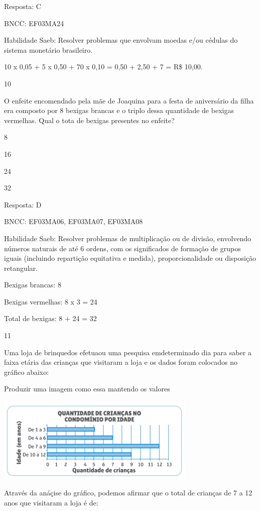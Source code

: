 \begin{escolha}
{\begin{escolha}
{Resposta: C

BNCC: EF03MA24

Habilidade Saeb: Resolver problemas que envolvam moedas e/ou cédulas do
sistema monetário brasileiro.

10 x 0,05 + 5 x 0,50 + 70 x 0,10 = 0,50 + 2,50 + 7 = R\$ 10,00.

\num{10}

O enfeite encomendado pela mãe de Joaquina para a festa de aniversário
da filha era composto por 8 bexigas brancas e o triplo dessa quantidade
de bexigas vermelhas. Qual o tota de bexigas presentes no enfeite?

\begin{escolha}

\item
  8
\item
  16
\item
  24
\item
  32
\end{escolha}

Resposta: D

BNCC: EF03MA06, EF03MA07, EF03MA08

Habilidade Saeb: Resolver problemas de multiplicação ou de divisão,
envolvendo números naturais de até 6 ordens, com os significados de
formação de grupos iguais (incluindo repartição equitativa e medida),
proporcionalidade ou disposição retangular.

Bexigas brancas: 8

Bexigas vermelhas: 8 x 3 = 24

Total de bexigas: 8 + 24 = 32

\num{11}

Uma loja de brinquedos efetuaou uma pesquisa emdeterminado dia para
saber a faixa etária das crianças que visitaram a loja e os dados foram
colocados no gráfico abaixo:

Produzir uma imagem como essa mantendo os valores

\includegraphics[width=3.77564in,height=1.60972in]{media/image136.png}

Através da anáçise do gráfico, podemos afirmar que o total de crianças
de 7 a 12 anos que visitaram a loja é de:

}
\end{escolha}}
\end{escolha}
